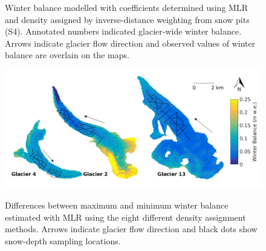 \documentclass{sfuthesis}
\newcommand{\topomap}{Arrows indicate glacier flow direction and black dots show snow-depth sampling locations. }
\newcommand{\swedots}{Arrows indicate glacier flow direction and observed values of winter balance are overlain on the maps. }
\begin{document}
{\begin{figure}[H]
	\caption[Winter balance modelled with coefficients determined using MLR and density assigned by inverse-distance weighting from snow pits (S4)]{Winter balance modelled with coefficients determined using MLR and density assigned by inverse-distance weighting from snow pits (S4). Annotated numbers indicated glacier-wide winter balance. \swedots}
	\label{fig:MLRmodelledSWE}
\end{figure}

\begin{figure}[H]
	\centering
	\includegraphics[width =\textwidth]{MLR_SWEdifferenceMap.png}\\
	\caption[Differences between maximum and minimum winter balance estimated with MLR using the eight different density assignment methods]{Differences between maximum and minimum winter balance estimated with MLR using the eight different density assignment methods. \topomap}
	\label{fig:MLR_SWEdiffMap}
\end{figure}

}
\end{document}
